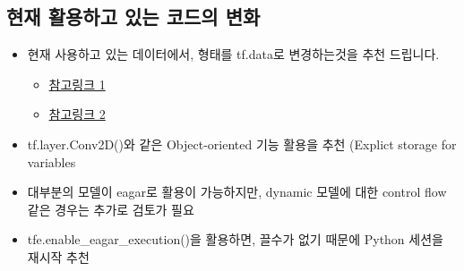 \documentclass[11pt]{article}
\providecommand{\tightlist}{%
      \setlength{\itemsep}{0pt}\setlength{\parskip}{0pt}}
\begin{document}
\hypertarget{uxd604uxc7ac-uxd65cuxc6a9uxd558uxace0-uxc788uxb294-uxcf54uxb4dcuxc758-uxbcc0uxd654}{%
\subsection{현재 활용하고 있는 코드의
변화}\label{uxd604uxc7ac-uxd65cuxc6a9uxd558uxace0-uxc788uxb294-uxcf54uxb4dcuxc758-uxbcc0uxd654}}

\begin{itemize}
\tightlist
\item
  현재 사용하고 있는 데이터에서, 형태를 tf.data로 변경하는것을 추천
  드립니다.

  \begin{itemize}
  \tightlist
  \item
    \href{https://developers.googleblog.com/2017/09/introducing-tensorflow-datasets.html}{참고링크
    1}
  \item
    \href{https://www.tensorflow.org/programmers_guide/datasets}{참고링크
    2}
  \end{itemize}
\item
  tf.layer.Conv2D()와 같은 Object-oriented 기능 활용을 추천 (Explict
  storage for variables
\item
  대부분의 모델이 eagar로 활용이 가능하지만, dynamic 모델에 대한 control
  flow같은 경우는 추가로 검토가 필요
\item
  tfe.enable\_eagar\_execution()을 활용하면, 끌수가 없기 때문에 Python
  세션을 재시작 추천
\end{itemize}


    
    
    
    
\end{document}
